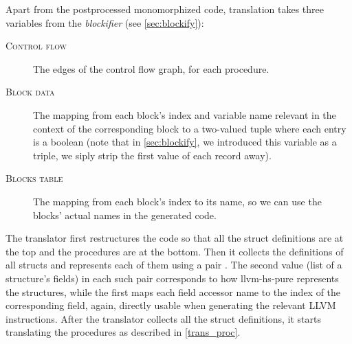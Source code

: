 Apart from the postprocessed monomorphized code, translation takes three variables from the \emph{blockifier} (see \cref{sec:blockify}):

\begin{description}
    \item[\textsc{Control flow}] The edges of the control flow graph, for each procedure.
    \item[\textsc{Block data}] The mapping from each block's index and variable name relevant in the context of the corresponding block to a two-valued tuple \linebreak {} where each entry is a boolean (note that in \cref{sec:blockify}, we introduced this variable as a triple, we siply strip the first value of each record away).
    \item[\textsc{Blocks table}] The mapping from each block's index to its name, so we can use the blocks' actual names in the generated code.
\end{description}

The translator first restructures the code so that all the struct definitions are at the top and the procedures are at the bottom. Then it collects the definitions of all structs and represents each of them using a pair  . The second value (list of a structure's fields) in each such pair corresponds to how llvm-hs-pure represents the structures, while the first maps each field accessor name to the index of the corresponding field, again, directly usable when generating the relevant LLVM instructions. After the translator collects all the struct definitions, it starts translating the procedures as described in \cref{trans_proc}.

